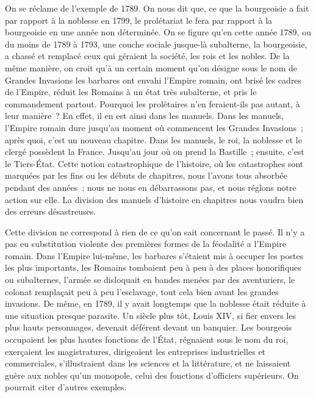 \documentclass[french,twoside]{book} %
\begin{document}
On se réclame de l'exemple de 1789. On nous dit que, ce que la bourgeoisie a fait par rapport à la noblesse en 1799, le prolétariat le fera par rapport à la bourgeoisie en une année non déterminée. On se figure qu'en cette année 1789, ou du moins de 1789 à 1793, une couche sociale jusque-là subalterne, la bourgeoisie, a chassé et remplacé ceux qui géraient la société, les rois et les nobles. De la même manière, on croit qu'à un certain moment qu'on désigne sous le nom de Grandes Invasions les barbares ont envahi l'Empire romain, ont brisé les cadres de l'Empire, réduit les Romains à un état très subalterne, et pris le commandement partout. Pourquoi les prolétaires n'en feraient-ils pas autant, à leur manière ? En effet, il en est ainsi dans les manuels. Dans les manuels, l'Empire romain dure jusqu'au moment où commencent les Grandes Invasions ; après quoi, c'est un nouveau chapitre. Dans les manuels, le roi, la noblesse et le clergé possèdent la France. Jusqu'au jour où on prend la Bastille ; ensuite, c'est le Tiers-État. Cette notion catastrophique de l'histoire, où les catastrophes sont marquées par les fins ou les débuts de chapitres, nous l'avons tous absorbée pendant des années ; nous ne nous en débarrassons pas, et nous réglons notre action sur elle. La division des manuels d'histoire en chapitres nous vaudra bien des erreurs désastreuses.\par
Cette division ne correspond à rien de ce qu'on sait concernant le passé. Il n'y a pas eu substitution violente des premières formes de la féodalité a l’Empire romain. Dans l'Empire lui-même, les barbares s'étaient mis à occuper les postes les plus importants, les Romains tombaient peu à peu à des places honorifiques ou subalternes, l'armée se disloquait en bandes menées par des aventuriers, le colonat remplaçait peu à peu l'esclavage, tout cela bien avant les grandes invasions. De même, en 1789, il y avait longtemps que la noblesse était réduite à une situation presque parasite. Un siècle plus tôt, Louis XIV, si fier envers les plus hauts personnages, devenait déférent devant un banquier. Les bourgeois occupaient les plus hautes fonctions de l'État, régnaient sous le nom du roi, exerçaient les magistratures, dirigeaient les entreprises industrielles et commerciales, s'illustraient dans les sciences et la littérature, et ne laissaient guère aux nobles qu'un monopole, celui des fonctions d'officiers supérieurs. On pourrait citer d'autres exemples.\par
\end{document}
